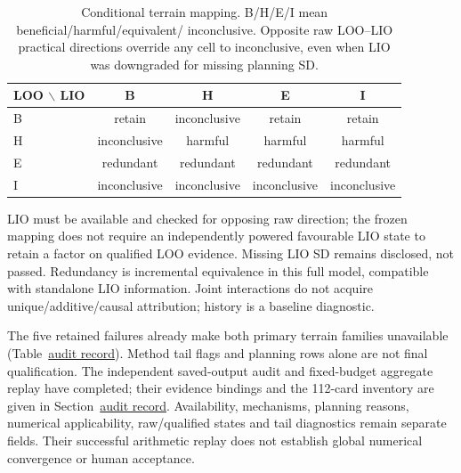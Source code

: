 \begin{table}[htbp]
\centering\small
\caption{Conditional terrain mapping. B/H/E/I mean beneficial/harmful/equivalent/
inconclusive. Opposite raw LOO--LIO practical directions override any cell
to inconclusive, even when LIO was downgraded for missing planning SD.}
\label{tab:loo-lio-states}\hypertarget{tab:loo-lio-states}{}
\begin{tabular}{lcccc}
\toprule
LOO \(\backslash\) LIO & B & H & E & I\\
\midrule
B & retain & inconclusive & retain & retain\\
H & inconclusive & harmful & harmful & harmful\\
E & redundant & redundant & redundant & redundant\\
I & inconclusive & inconclusive & inconclusive & inconclusive\\
\bottomrule
\end{tabular}
\end{table}

LIO must be available and checked for opposing raw direction; the frozen
mapping does not require an independently powered favourable LIO state
to retain a factor on qualified LOO evidence. Missing LIO SD remains disclosed,
not passed. Redundancy is incremental equivalence in this full model,
compatible with standalone LIO information. Joint interactions do not acquire
unique/additive/causal attribution; history is a baseline diagnostic.

The five retained failures already make both primary terrain families
unavailable (Table~\href{audit-notes.pdf\#tab:failure-family-dispositions}{audit record}). Method tail flags
and planning rows alone are not final qualification. The independent saved-output
audit and fixed-budget aggregate replay have completed; their evidence bindings
and the 112-card inventory are given in Section~\href{audit-notes.pdf\#sec:audited-review-update}{audit record}.
Availability, mechanisms, planning reasons, numerical applicability, raw/qualified
states and tail diagnostics remain separate fields. Their successful arithmetic
replay does not establish global numerical convergence or human acceptance.


